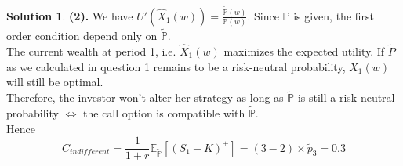 \documentclass[a4paper, 10pt]{article}
\theoremstyle{definition}
\theoremstyle{hSol}
\newtheorem*{solution}{Solution}
\begin{document}
\begin{solution}
\textbf{(2).} We have $U'(\hat{X}_1(w)) = \frac{\tilde{\mathbb{P}}(w)}{\mathbb{P}(w)}$. Since $\mathbb{P}$ is given, the first order condition depend only on $\tilde{\mathbb{P}}$. \\
The current wealth at period 1, i.e. $\hat{X}_1(w)$ maximizes the expected utility. If $\tilde{P}$ as we calculated in question 1 remains to be a risk-neutral probability, $\hat{X}_1(w)$ will still be optimal. \\
Therefore, the investor won't alter her strategy as long as $\tilde{\mathbb{P}}$ is still a risk-neutral probability $\iff$ the call option is compatible with $\tilde{\mathbb{P}}$.\\
Hence
\begin{equation}
	C_{indifferent} = \frac{1}{1+r} \mathbb{E}_{\tilde{\mathbb{P}}}\left[(S_1-K)^+\right] = (3-2)\times \tilde{p}_3 = 0.3
\end{equation}
\end{solution}
\end{document}

